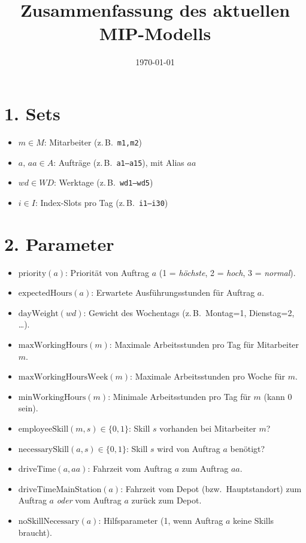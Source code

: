 \documentclass[12pt,a4paper]{article}
\title{Zusammenfassung des aktuellen MIP-Modells}
\date{\today}
\begin{document}
\maketitle

\section*{1. Sets}
\begin{itemize}
  \item $m \in M$: Mitarbeiter (z.\,B.\ \texttt{m1,m2})
  \item $a,\,aa \in A$: Aufträge (z.\,B.\ \texttt{a1--a15}), mit Alias $aa$
  \item $wd \in WD$: Werktage (z.\,B.\ \texttt{wd1--wd5})
  \item $i \in I$: Index-Slots pro Tag (z.\,B.\ \texttt{i1--i30})
\end{itemize}

\section*{2. Parameter}
\begin{itemize}
  \item $\text{priority}(a)$: Priorität von Auftrag $a$ (1 = \emph{höchste}, 2 = \emph{hoch}, 3 = \emph{normal}).
  \item $\text{expectedHours}(a)$: Erwartete Ausführungsstunden für Auftrag $a$.
  \item $\text{dayWeight}(wd)$: Gewicht des Wochentags (z.\,B.\ Montag=1, Dienstag=2, \dots).
  \item $\text{maxWorkingHours}(m)$: Maximale Arbeitsstunden pro Tag für Mitarbeiter $m$.
  \item $\text{maxWorkingHoursWeek}(m)$: Maximale Arbeitsstunden pro Woche für $m$.
  \item $\text{minWorkingHours}(m)$: Minimale Arbeitsstunden pro Tag für $m$ (kann $0$ sein).
  \item $\text{employeeSkill}(m,s) \in \{0,1\}$: Skill $s$ vorhanden bei Mitarbeiter $m$?
  \item $\text{necessarySkill}(a,s) \in \{0,1\}$: Skill $s$ wird von Auftrag $a$ benötigt?
  \item $\text{driveTime}(a,aa)$: Fahrzeit vom Auftrag $a$ zum Auftrag $aa$.
  \item $\text{driveTimeMainStation}(a)$: Fahrzeit vom Depot (bzw.\ Hauptstandort) zum Auftrag $a$ \emph{oder} vom Auftrag $a$ zurück zum Depot.
  \item $\text{noSkillNecessary}(a)$: Hilfsparameter (1, wenn Auftrag $a$ keine Skills braucht).
\end{itemize}
\end{document}
